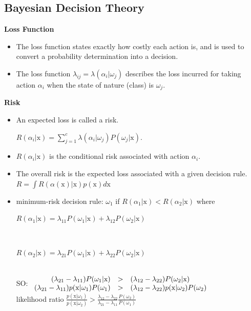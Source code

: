 \documentclass{../cheat}
\begin{document}
\begin{multicols}{3}
	\subsection{Bayesian Decision Theory}
	\textbf{Loss Function}
	\begin{itemize}[nolistsep, leftmargin=1em]
		\item The loss function states exactly how costly each action is, and is used to convert a probability determination into a decision.
		\item The loss function $\lambda_{ij}=\lambda(\alpha_i|\omega_j)$ describes the loss incurred for taking action $\alpha_i$ when the state of nature (class) is $\omega_j$.
	\end{itemize}
	
	\textbf{Risk}
	\begin{itemize}[nolistsep, leftmargin=1em]
		\item An expected loss is called a risk.\\
			\centerline{$R(\alpha_i|\mathrm{x}) =\sum_{j=1}^c \lambda(\alpha_i|\omega_j) P(\omega_j|\mathrm{x})$.}
		\item $R(\alpha_i|\mathrm{x})$ is the conditional risk associated with action $\alpha_i$.
		\item The overall risk is the expected loss associated with a given decision rule. $ R =\int R(\alpha(\mathrm{x})|\mathrm{x}) p(\mathrm{x}) d\mathrm{x}$
		\item minimum-risk decision rule: $\omega_1$ if $R(\alpha_1|\mathrm{x}) < R(\alpha_2|\mathrm{x})$ where \\
			\centerline{$R(\alpha_1|\mathrm{x}) = \lambda_{11}P(\omega_1|\mathrm{x}) + \lambda_{12}P(\omega_2|\mathrm{x})$}\\
			\centerline{$R(\alpha_2|\mathrm{x}) = \lambda_{21}P(\omega_1|\mathrm{x}) + \lambda_{22}P(\omega_2|\mathrm{x})$}\\
		SO: $\begin{array}{r c l}
			(\lambda_{21}-\lambda_{11}) P(\omega_1|\mathrm{x}) &>& (\lambda_{12}-\lambda_{22}) P(\omega_2|\mathrm{x})\\
			(\lambda_{21}-\lambda_{11}) p(\mathrm{x}|\omega_1) P(\omega_1) &>& (\lambda_{12}-\lambda_{22}) p(\mathrm{x}|\omega_2) P(\omega_2)
		\end{array}  $\\
		likelihood ratio $\frac{p(\mathrm{x}|\omega_1)}{p(\mathrm{x}|\omega_2)} > \frac{\lambda_{12}-\lambda_{22}}{\lambda_{21}-\lambda_{11}} \frac{P(\omega_2)}{P(\omega_1)}$
	\end{itemize}


\end{multicols}
\end{document}
